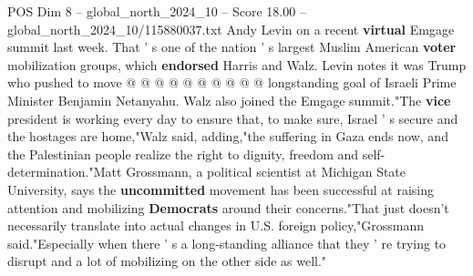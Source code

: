 \begin{textsample}{POS Dim 8 – global\_north\_2024\_10 – Score 18.00 – global\_north\_2024\_10/115880037.txt}
Andy Levin on a recent \textbf{virtual} Emgage summit last week.
That ' s one of the nation ' s largest Muslim American \textbf{voter} mobilization groups, which \textbf{endorsed} Harris and Walz.
Levin notes it was Trump who pushed to move @ @ @ @ @ @ @ @ @ @ longstanding goal of Israeli Prime Minister Benjamin Netanyahu.
Walz also joined the Emgage summit."The \textbf{vice} president is working every day to ensure that, to make sure, Israel ' s secure and the hostages are home,"Walz said, adding,"the suffering in Gaza ends now, and the Palestinian people realize the right to dignity, freedom and self-determination."Matt Grossmann, a political scientist at Michigan State University, says the \textbf{uncommitted} movement has been successful at raising attention and mobilizing \textbf{Democrats} around their concerns."That just doesn't necessarily translate into actual changes in U.S. foreign policy,"Grossmann said."Especially when there ' s a long-standing alliance that they ' re trying to disrupt and a lot of mobilizing on the other side as well."

\end{textsample}
